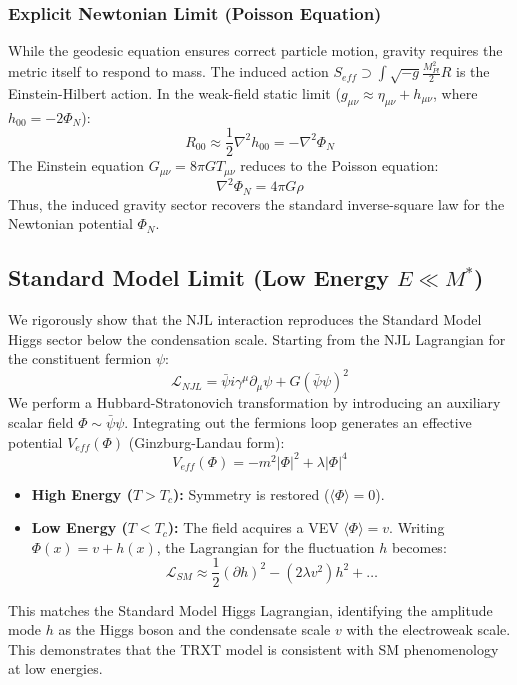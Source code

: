 \documentclass[a4paper,12pt]{article}
\begin{document}
\subsubsection{Explicit Newtonian Limit (Poisson Equation)}
While the geodesic equation ensures correct particle motion, gravity requires the metric itself to respond to mass.
The induced action $S_{eff} \supset \int \sqrt{-g} \frac{M_{Pl}^2}{2} R$ is the Einstein-Hilbert action.
In the weak-field static limit ($g_{\mu\nu} \approx \eta_{\mu\nu} + h_{\mu\nu}$, where $h_{00} = -2\Phi_N$):
\begin{equation}
    R_{00} \approx \frac{1}{2} \nabla^2 h_{00} = -\nabla^2 \Phi_N
\end{equation}
The Einstein equation $G_{\mu\nu} = 8\pi G T_{\mu\nu}$ reduces to the Poisson equation:
\begin{equation}
    \nabla^2 \Phi_N = 4\pi G \rho
\end{equation}
Thus, the induced gravity sector recovers the standard inverse-square law for the Newtonian potential $\Phi_N$.

\subsection{Standard Model Limit (Low Energy $E \ll M^*$)}\label{sec:smlimit}

We rigorously show that the NJL interaction reproduces the Standard Model Higgs sector below the condensation scale.
Starting from the NJL Lagrangian for the constituent fermion $\psi$:
\begin{equation}
    \mathcal{L}_{NJL} = \bar{\psi} i \gamma^\mu \partial_\mu \psi + G (\bar{\psi}\psi)^2
\end{equation}
We perform a Hubbard-Stratonovich transformation by introducing an auxiliary scalar field $\Phi \sim \bar{\psi}\psi$. Integrating out the fermions loop generates an effective potential $V_{eff}(\Phi)$ (Ginzburg-Landau form):
\begin{equation}
    V_{eff}(\Phi) = -m^2 |\Phi|^2 + \lambda |\Phi|^4
\end{equation}
\begin{itemize}
    \item \textbf{High Energy ($T > T_c$):} Symmetry is restored ($\langle \Phi \rangle = 0$).
    \item \textbf{Low Energy ($T < T_c$):} The field acquires a VEV $\langle \Phi \rangle = v$. Writing $\Phi(x) = v + h(x)$, the Lagrangian for the fluctuation $h$ becomes:
    \begin{equation}
        \mathcal{L}_{SM} \approx \frac{1}{2}(\partial h)^2 - (2\lambda v^2) h^2 + \dots
    \end{equation}
\end{itemize}
This matches the Standard Model Higgs Lagrangian, identifying the amplitude mode $h$ as the Higgs boson and the condensate scale $v$ with the electroweak scale. This demonstrates that the TRXT model is consistent with SM phenomenology at low energies.
\end{document}
